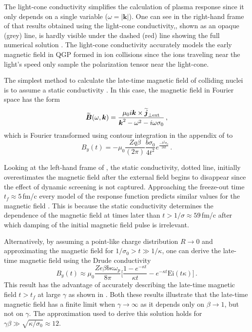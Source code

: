 The light-cone conductivity  simplifies the calculation of plasma response since it only depends on a single variable ($\omega = |\boldsymbol{k}|$). One can see in the right-hand frame of  that results obtained using the light-cone conductivity,, shown as an opaque (grey) line, is hardly visible under the  dashed (red) line showing the full numerical solution . The light-cone conductivity accurately models the early magnetic field in QGP formed in ion collisions since the ions traveling near the light's speed only sample the polarization tensor near the light-cone. 

The simplest method to calculate the late-time magnetic field of colliding nuclei is to assume a static conductivity \cite{Tuchin:2013apa}. In this case, the magnetic field in Fourier space has the form
\begin{equation}\label{eq:bstat}
    \widetilde{\boldsymbol{B}}(\omega,\boldsymbol{k}) = \frac{ \mu_0 i\boldsymbol{k} \times \widetilde{\boldsymbol{j}}_{\perp \text{ext}}}{\boldsymbol{k}^2 - \omega^2 - i\omega\sigma_0}\,,
\end{equation}
which is Fourier transformed using contour integration in the appendix of \cite{Grayson:2022asf} to
\begin{equation}\label{eq:banalyticapp}
   B_y(t) = -\mu_0 \frac{ Zq \beta }{(2\pi)} \frac{ b\sigma_0}{4t^2} e^{\frac{-b^2 \sigma_0}{16 t}}\,.
\end{equation}

Looking at the left-hand frame of , the static conductivity, dotted line, initially overestimates the magnetic field after the external field begins to disappear since the effect of dynamic screening is not captured. Approaching the freeze-out time $t_f \approx 5\,$fm/c every model of the response function predicts similar values for the magnetic field \cite{Song:2007ux}. This is because the static conductivity determines the dependence of the magnetic field at times later than $t>1/\sigma \approx 59$\,fm/c after which damping of the initial magnetic field pulse is irrelevant. 

Alternatively, by assuming a point-like charge distribution $R\rightarrow 0$ and approximating the magnetic field for $ 1/\sigma_0 > t\gg 1/\kappa$, one can derive the late-time magnetic field using the Drude conductivity 
\begin{equation}\label{eq:latetimeB}
   B_y(t) \approx  \mu_0 \frac{ Ze \beta b \kappa \omega_p }{8\pi}\bigg[ \frac{1- e^{-\kappa t}}{\kappa t} - e^{-\kappa t} \text{Ei}\left(t\kappa\right)\bigg]\,.
\end{equation}
This result has the advantage of accurately describing the late-time magnetic field $t>t_f$  at large $\gamma$ as shown in . Both these results illustrate that the late-time magnetic field has a finite limit when $\gamma\rightarrow\infty$ as it depends only on $\beta\to 1$, but not on $\gamma$. The approximation used to derive this solution holds for $\gamma\beta \gg \sqrt{ \kappa/\sigma_0} \approx 12$. 

